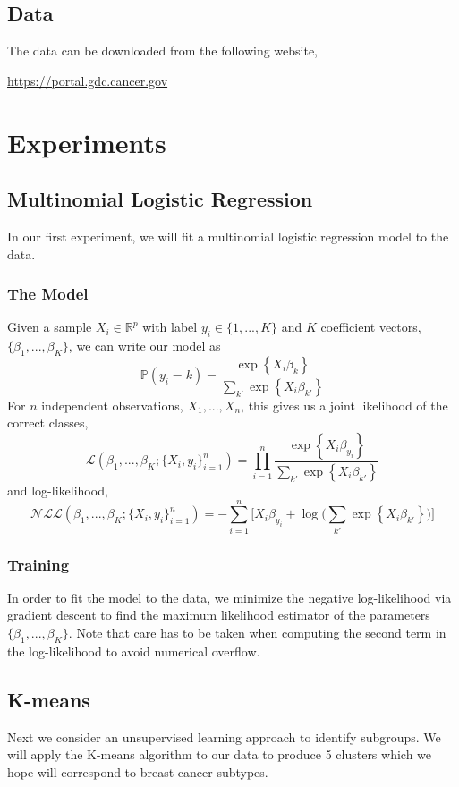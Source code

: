 \documentclass{article}
\begin{document}
\subsection{Data}
The data can be downloaded from the following website,
\begin{center}
\url{https://portal.gdc.cancer.gov}
\end{center}

\section{Experiments}
\label{experiments}

\subsection{Multinomial Logistic Regression}
In our first experiment, we will fit a multinomial logistic regression model to the data. 
\subsubsection{The Model}
Given a sample $X_i \in \mathbb{R}^p$ with label $y_i \in \{1, ..., K\}$ and $K$ coefficient vectors, $\{\beta_1, ..., \beta_K\}$, we can write our model as
\[ \mathbb{P}(y_i = k) = \frac{\exp\left\{X_i\beta_k\right\}}{\sum_{k'} \exp\left\{X_i\beta_{k'}\right\}} \]
For $n$ independent observations, $X_1, ..., X_n$, this gives us a joint likelihood of the correct classes,
\[ \mathcal{L}(\beta_1, ..., \beta_K; \{X_i, y_i\}_{i=1}^n) = \prod\limits_{i=1}^n \frac{\exp\left\{X_i \beta_{y_i}\right\}}{\sum_{k'} \exp\left\{X_i \beta_{k'}\right\}} \]
and log-likelihood,
\[ \mathcal{NLL}(\beta_1, ..., \beta_K; \{X_i, y_i\}_{i=1}^n) = -\sum\limits_{i=1}^n\bigg[ X_i \beta_{y_i} + \log\bigg(\sum\limits_{k'} \exp\left\{X_i \beta_{k'}\right\}\bigg)\bigg] \]
\subsubsection{Training}
In order to fit the model to the data, we minimize the negative log-likelihood via gradient descent to find the maximum likelihood estimator of the parameters $\{\beta_1, ..., \beta_K\}$. Note that care has to be taken when computing the second term in the log-likelihood to avoid numerical overflow.

\subsection{K-means}
Next we consider an unsupervised learning approach to identify subgroups. We will apply the K-means algorithm to our data to produce 5 clusters which we hope will correspond to breast cancer subtypes. 
\end{document}
